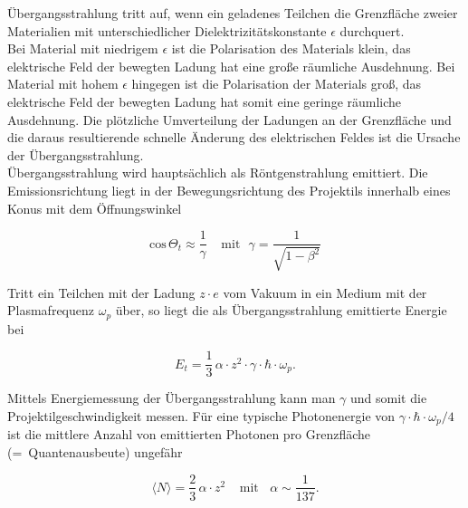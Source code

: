 \FloatBarrier
Übergangsstrahlung tritt auf, wenn ein geladenes Teilchen die Grenzfläche zweier
Materialien mit unterschiedlicher Dielektrizitätskonstante $\epsilon$ durchquert.
\\
Bei Material mit niedrigem $\epsilon$ ist die Polarisation des Materials klein, das elektrische Feld
der bewegten Ladung hat eine große räumliche Ausdehnung. Bei Material mit hohem $\epsilon$ hingegen
ist die Polarisation der Materials groß, das elektrische Feld der bewegten Ladung hat somit eine
geringe räumliche Ausdehnung. Die plötzliche Umverteilung der Ladungen an der Grenzfläche und die
daraus resultierende schnelle Änderung des elektrischen Feldes ist die Ursache der
Übergangsstrahlung.
\\
Übergangsstrahlung wird hauptsächlich als Röntgenstrahlung emittiert. Die Emissionsrichtung liegt in
der Bewegungsrichtung des Projektils innerhalb eines Konus mit dem Öffnungswinkel

\[\text{cos}\,\Theta_t \approx \frac{1}{\gamma}~~~~~\text{mit}~~~\gamma=\frac{1}{\sqrt{1-\beta^2}} 
\]

Tritt ein Teilchen mit der Ladung $z\cdot e$ vom Vakuum in ein Medium mit der Plasmafrequenz
$\omega_p$ über, so liegt die als Übergangsstrahlung emittierte Energie bei

\[E_t = \frac{1}{3}\, \alpha\cdot z^2\cdot \gamma\cdot \hbar\cdot\omega_p. \]

Mittels Energiemessung der Übergangsstrahlung kann man $\gamma$ und somit die
Projektilgeschwindigkeit messen. Für eine typische Photonenergie von $\gamma\cdot
\hbar\cdot\omega_p/4$ ist die mittlere Anzahl von emittierten Photonen pro Grenzfläche
(=~Quantenausbeute) ungefähr

\[ \langle N \rangle = \frac{2}{3}\,\alpha\cdot z^2~~~~~\text{mit}~~~~\alpha\sim \frac{1}{137}.  \]

\FloatBarrier